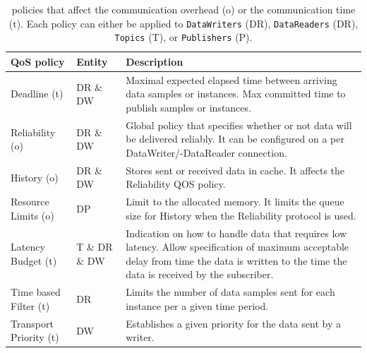\begin{table}[h!]
	\begin{center}
		\caption{ policies that affect the communication overhead (o) or the communication time (t). Each  policy can either be applied to \texttt{DataWriters} (DR), \texttt{DataReaders} (DR), \texttt{Topics} (T), or \texttt{Publishers} (P).}
		\label{tab:qos_garciavalls}
		\begin{tabularx}{\textwidth}{|l|l|X|}
			\hline
			\textbf{QoS policy} & \textbf{Entity} & \textbf{Description}\\
			\hline \hline
			Deadline (t) & DR \& DW & Maximal expected elapsed time between arriving data samples or instances. Max committed time to publish samples or instances.\\
			\hline
			Reliability (o) & DR \& DW & Global policy that specifies whether or not data will be delivered reliably. It can be configured on a per DataWriter/-DataReader connection. \\
			\hline
			History (o) & DR \& DW & Stores sent or received data in cache. It affects the Reliability \gls*{QOS} policy. \\
			\hline
			Resource Limits (o) & DP & Limit to the allocated memory. It limits the queue size for History when the Reliability protocol is used. \\
			\hline
			Latency Budget (t) & T \& DR \& DW & Indication on how to handle data that requires low latency. Allow specification of maximum acceptable delay from time the data is written to the time the data is received by the subscriber. \\
			\hline
			Time based Filter (t) & DR & Limits the number of data samples sent for each instance per a given time period. \\
			\hline
			Transport Priority (t) & DW & Establishes a given priority for the data sent by a writer.\\
			\hline
		\end{tabularx}
	\end{center}
\end{table}

